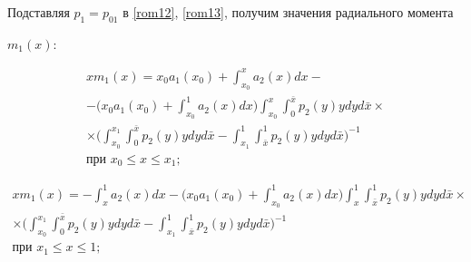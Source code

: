 Подставляя $p_1=p_{01}$ в \eqref{rom12}, \eqref{rom13}, получим значения радиального момента

$m_1 (x)$:

\begin{multline}

\label{rom15-1}

x m_1(x)=

x_0a_1(x_0)+\int_{x_0}^x a_2(x)dx-

\\

-

\biggl(

x_0a_1(x_0)+\int_{x_0}^1 a_2(x)dx\biggr)

\int_{x_0}^x  \int_0^{\bar{x}}{p_2(y)y}dy  d\bar{x}

\times

\\

\times

\biggl(

\int_{x_0}^{x_1}

\int_0^{\bar{x}} p_2(y)ydy  d\bar{x}-

\int_{x_1}^1

\int_{\bar{x}}^1 p_2(y)y dy  d\bar{x}\biggr)^{-1} \\ \text{при $x_0\le x\le x_1$};

\end{multline}



\begin{multline}

\label{rom15-2}

x m_1(x)= -  \int_x^1 a_2(x)dx-



\biggl(

x_0 a_1(x_0)+\int_{x_0}^1 a_2(x)dx

\biggr)

\int_x^1

\int_{\bar{x}}^1 p_2(y)ydy

d\bar{x}

\times

\\

\times

\biggl(

\int_{x_0}^{x_1}

\int_0^{\bar{x}} p_2(y)y dy  d\bar{x} -

\int_{x_1}^1 \int_{\bar{x}}^1{p_2(y)y}dy d\bar{x}\biggr)^{-1}

\\

\text{при $x_1\le x\le 1$};

\end{multline}



